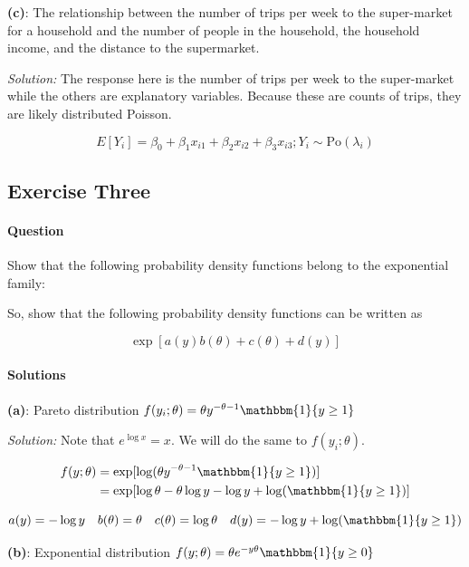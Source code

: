 \documentclass[]{article}
\let\oldparagraph\paragraph
\renewcommand{\paragraph}[1]{\oldparagraph{#1}\mbox{}}
\begin{document}
\textbf{(c)}: The relationship between the number of trips per week to
the super-market for a household and the number of people in the
household, the household income, and the distance to the supermarket.

\emph{Solution: } The response here is the number of trips per week to
the super-market while the others are explanatory variables. Because
these are counts of trips, they are likely distributed Poisson.

\[E[Y_i] = \beta_0 + \beta_1x_{i1} + \beta_2x_{i2} + \beta_3x_{i3}; Y_i \sim \text{Po}(\lambda_i)\]
\pagebreak

\subsection{Exercise Three}\label{exercise-three}

\paragraph{Question}\label{question-1}

Show that the following probability density functions belong to the
exponential family:

So, show that the following probability density functions can be written
as

\[\exp[a(y)b(\theta) + c(\theta) + d(y)]\]

\paragraph{Solutions}\label{solutions-1}

\textbf{(a)}: Pareto distribution
\(f(y_i; \theta) = \theta y^{-\theta - 1}\mathbbm{1}\{y \geq 1\}\)

\emph{Solution: } Note that \(e^{\log x} = x\). We will do the same to
\(f(y_i; \theta)\).

\begin{align*}
f(y; \theta) &= \exp[\log(\theta y^{-\theta - 1}\mathbbm{1}\{y \geq 1\})]\\
&= \exp[\log\theta - \theta\log y - \log y + \log(\mathbbm{1}\{y \geq 1\})]
\end{align*}

\[a(y) = -\log y \quad b(\theta)= \theta \quad c(\theta) = \log\theta \quad d(y) = -\log y + \log(\mathbbm{1}\{y \geq 1\})\]

\textbf{(b)}: Exponential distribution
\(f(y; \theta) = \theta e^{-y\theta}\mathbbm{1}\{y \geq 0\}\)
\end{document}
